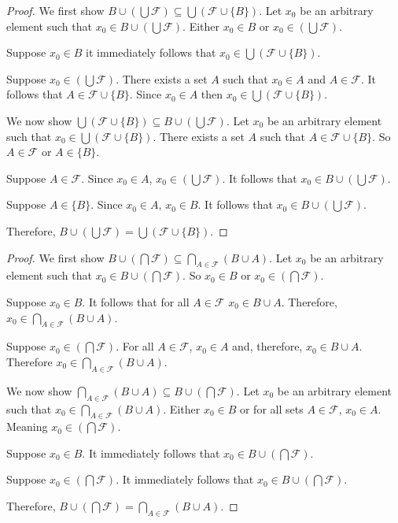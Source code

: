 \begin{proof}
    We first show $B \cup (\bigcup \mathcal{F}) \subseteq \bigcup(\mathcal{F} \cup \{B\})$.
    Let $x_0$ be an arbitrary element such that $x_0 \in B \cup (\bigcup \mathcal{F})$.
    Either $x_0 \in B$ or $x_0 \in (\bigcup \mathcal{F})$.

    Suppose $x_0 \in B$ it immediately follows that $x_0 \in \bigcup(\mathcal{F}
        \cup \{B\})$.

    Suppose $x_0 \in (\bigcup \mathcal{F})$. There exists a set $A$ such that $x_0
        \in A$ and $A \in \mathcal{F}$. It follows that $A \in \mathcal{F} \cup \{B\}$.
    Since $x_0 \in A$ then $x_0 \in \bigcup(\mathcal{F} \cup \{B\})$.

    We now show $\bigcup(\mathcal{F} \cup \{B\}) \subseteq B \cup (\bigcup
        \mathcal{F})$. Let $x_0$ be an arbitrary element such that $x_0 \in
        \bigcup(\mathcal{F} \cup \{B\})$. There exists a set $A$ such that $A \in
        \mathcal{F} \cup \{B\}$. So $A \in \mathcal{F}$ or $A \in \{B\}$.

    Suppose $A \in \mathcal{F}$. Since $x_0 \in A$, $x_0 \in
        (\bigcup{\mathcal{F}})$. It follows that $x_0 \in B \cup (\bigcup
        \mathcal{F})$.

    Suppose $A \in \{B\}$. Since $x_0 \in A$, $x_0 \in B$. It follows that $x_0 \in
        B \cup (\bigcup \mathcal{F})$.

    Therefore, $B \cup (\bigcup \mathcal{F}) = \bigcup(\mathcal{F} \cup \{B\})$.
\end{proof}

\begin{proof}
    We first show $B \cup (\bigcap \mathcal{F}) \subseteq \bigcap_{A \in \mathcal{F}}(B \cup A)$.
    Let $x_0$ be an arbitrary element such that $x_0 \in B \cup (\bigcap \mathcal{F})$.
    So $x_0 \in B$ or $x_0 \in (\bigcap{\mathcal{F}})$.

    Suppose $x_0 \in B$. It follows that for all $A \in \mathcal{F}$ $x_0 \in B
        \cup A$. Therefore, $x_0 \in \bigcap_{A \in \mathcal{F}}(B \cup A)$.

    Suppose $x_0 \in (\bigcap \mathcal{F})$. For all $A \in \mathcal{F}$, $x_0 \in
        A$ and, therefore, $x_0 \in B \cup A$. Therefore $x_0 \in \bigcap_{A \in
            \mathcal{F}}(B \cup A)$.

    We now show $\bigcap_{A \in \mathcal{F}}(B \cup A) \subseteq B \cup (\bigcap
        \mathcal{F})$. Let $x_0$ be an arbitrary element such that $x_0 \in \bigcap_{A
            \in \mathcal{F}}(B \cup A)$. Either $x_0 \in B$ or for all sets $A \in
        \mathcal{F}$, $x_0 \in A$. Meaning $x_0 \in (\bigcap\mathcal{F})$.

    Suppose $x_0 \in B$. It immediately follows that $x_0 \in B \cup
        (\bigcap\mathcal{F})$.

    Suppose $x_0 \in (\bigcap\mathcal{F})$. It immediately follows that $x_0 \in B
        \cup (\bigcap\mathcal{F})$.

    Therefore, $B \cup (\bigcap \mathcal{F}) = \bigcap_{A \in \mathcal{F}}(B \cup
        A)$.
\end{proof}

